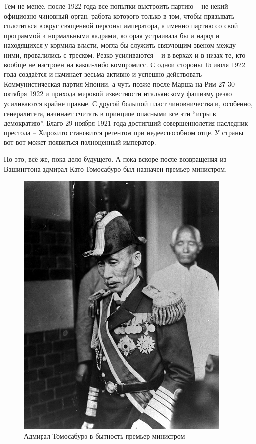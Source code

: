 Тем не менее, после 1922 года все попытки выстроить партию – не некий официозно-чиновный орган, работа которого только в том, чтобы призывать сплотиться вокруг священной персоны императора, а именно партию со свой программой и нормальными кадрами, которая устраивала бы и народ и находящихся у кормила власти, могла бы служить связующим звеном между ними, провалились с треском. Резко усиливаются – и в верхах и в низах те, кто вообще не настроен на какой-либо компромисс. С одной стороны 15 июля 1922 года создаётся и начинает весьма активно и успешно действовать Коммунистическая партия Японии, а чуть позже после Марша на Рим 27-30 октября 1922 и прихода мировой известности итальянскому фашизму резко усиливаются крайне правые. С другой большой пласт чиновничества и, особенно, генералитета, начинает считать в принципе опасными все эти “игры в демократию”. Благо 29 ноября 1921 года достигший совершеннолетия наследник престола – Хирохито становится регентом при недееспособном отце. У страны вот-вот может появиться полноценный император.

Но это, всё же, пока дело будущего. А пока вскоре после возвращения из Вашингтона адмирал Като Томосабуро был назначен премьер-министром. 

\begin{figure}[h!tb] 
	\centering\includegraphics[scale=0.5]{Glava7/DWql6zvETIs.jpg}
	\caption{Адмирал Томосабуро в бытность премьер-министром}%
\end{figure}

